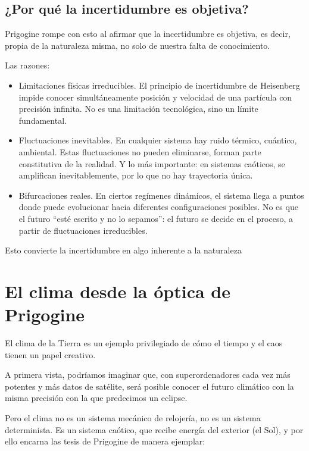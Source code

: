 \documentclass[
  10pt,
  a4paper,
  DIV=11,
  numbers=noendperiod,
  open=any]{scrreprt}
\numberwithin{equation}{chapter}
\numberwithin{equation}{section}
\renewcommand{\[}{\begin{equation}}
\renewcommand{\]}{\end{equation}}
\begin{document}
\section{¿Por qué la incertidumbre es
objetiva?}\label{por-quuxe9-la-incertidumbre-es-objetiva}

Prigogine rompe con esto al afirmar que la incertidumbre es objetiva, es
decir, propia de la naturaleza misma, no solo de nuestra falta de
conocimiento.

Las razones:

\begin{itemize}
\item
  Limitaciones físicas irreducibles. El principio de incertidumbre de
  Heisenberg impide conocer simultáneamente posición y velocidad de una
  partícula con precisión infinita. No es una limitación tecnológica,
  sino un límite fundamental.
\item
  Fluctuaciones inevitables. En cualquier sistema hay ruido térmico,
  cuántico, ambiental. Estas fluctuaciones no pueden eliminarse, forman
  parte constitutiva de la realidad. Y lo más importante: en sistemas
  caóticos, se amplifican inevitablemente, por lo que no hay trayectoria
  única.
\item
  Bifurcaciones reales. En ciertos regímenes dinámicos, el sistema llega
  a puntos donde puede evolucionar hacia diferentes configuraciones
  posibles. No es que el futuro ``esté escrito y no lo sepamos'': el
  futuro se decide en el proceso, a partir de fluctuaciones
  irreducibles.
\end{itemize}

Esto convierte la incertidumbre en algo inherente a la naturaleza

\chapter{El clima desde la óptica de
Prigogine}\label{el-clima-desde-la-uxf3ptica-de-prigogine}

El clima de la Tierra es un ejemplo privilegiado de cómo el tiempo y el
caos tienen un papel creativo.

A primera vista, podríamos imaginar que, con superordenadores cada vez
más potentes y más datos de satélite, será posible conocer el futuro
climático con la misma precisión con la que predecimos un eclipse.

Pero el clima no es un sistema mecánico de relojería, no es un sistema
determinista. Es un sistema caótico, que recibe energía del exterior (el
Sol), y por ello encarna las tesis de Prigogine de manera ejemplar:
\end{document}
